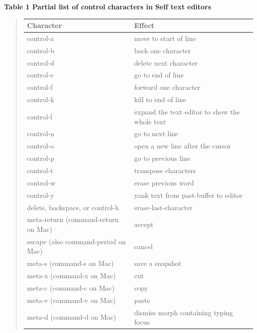 \documentclass[letterpaper,10pt,english]{sphinxmanual}
\begin{document}
\textbf{Table 1 Partial list of control characters in Self text editors}
\begin{quote}

\begin{tabulary}{\linewidth}{|L|L|}
\hline
\textbf{
Character
} & \textbf{
Effect
}\\\hline

control-a
 & 
move to start of line
\\\hline

control-b
 & 
back one character
\\\hline

control-d
 & 
delete next character
\\\hline

control-e
 & 
go to end of line
\\\hline

control-f
 & 
forward one character
\\\hline

control-k
 & 
kill to end of line
\\\hline

control-l
 & 
expand the text editor to show the whole text
\\\hline

control-n
 & 
go to next line
\\\hline

control-o
 & 
open a new line after the cursor
\\\hline

control-p
 & 
go to previous line
\\\hline

control-t
 & 
transpose characters
\\\hline

control-w
 & 
erase previous word
\\\hline

control-y
 & 
yank text from past-buffer to editor
\\\hline

delete, backspace, or control-h
 & 
erase-last-character
\\\hline

meta-return (command-return on Mac)
 & 
accept
\\\hline

escape (also command-period on Mac)
 & 
cancel
\\\hline

meta-s (command-s on Mac)
 & 
save a snapshot
\\\hline

meta-x (command-x on Mac)
 & 
cut
\\\hline

meta-c (command-c on Mac)
 & 
copy
\\\hline

meta-v (command-v on Mac)
 & 
paste
\\\hline

meta-d (command-d on Mac)
 & 
dismiss morph containing typing focus
\\\hline
\end{tabulary}

\end{quote}
\end{document}
